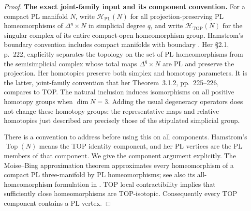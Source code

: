 \begin{proof}
\textbf{The exact joint-family input and its component convention.}
For a compact PL manifold $N$, write $\mathcal H_{\mathrm{PL}}(N)$ for
all projection-preserving PL homeomorphisms of $\Delta^q\times N$ in
simplicial degree $q$, and write $\mathcal H_{\mathrm{TOP}}(N)$ for the
singular complex of its entire compact-open homeomorphism group.
Hamstrom's boundary convention includes compact manifolds with boundary
\cite[\S0.2, p.~208]{Hamstrom1974}. Her \S2.1, p.~222, explicitly
separates the topology on the set of PL homeomorphisms from the
semisimplicial complex whose total maps $\Delta^q\times N$ are PL and
preserve the projection. Her homotopies preserve both simplex and homotopy
parameters. It is the latter, joint-family convention that her
Theorem~3.1.2, pp.~225--226, compares to TOP. The natural inclusion induces
isomorphisms on all positive homotopy groups when $\dim N=3$.
Adding the usual degeneracy operators does not change these homotopy
groups: the representative maps and relative homotopies just described
are precisely those of the stipulated simplicial group.

There is a convention to address before using this on all components.
Hamstrom's $\operatorname{Top}(N)$ means the TOP identity component, and
her PL vertices are the PL members of that component. We give the
component argument explicitly. The Moise--Bing approximation theorem
approximates every homeomorphism of a compact PL three-manifold by PL
homeomorphisms; see also its all-homeomorphism formulation in
\cite[Chapter~I, \S1, Theorem~1.1, p.~7]{Laudenbach1974}.
TOP local contractibility \cite{EdwardsKirby1971} implies that sufficiently
close homeomorphisms are TOP-isotopic. Consequently every TOP component
contains a PL vertex.


\end{proof}
